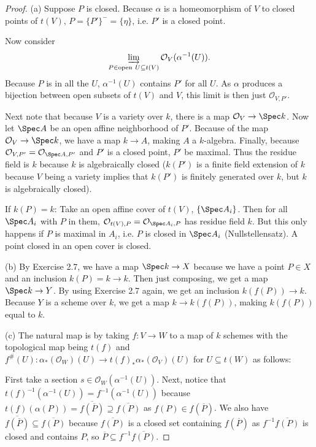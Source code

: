 \begin{proof}
	(a) Suppose $P $ is closed.
	Because $\alpha $ is a homeomorphism of $V $ to closed points of $t(V) $, $P = \{P' \} ^- = \{\eta \}     $, i.e. $P'  $ is a closed point.
	
	Now consider
	\[
		\varinjlim_{P \in \text{open}\ U \subseteq t(V)} \mathcal{O}_V(\alpha ^{-1}(U))
	.\] 
	Because $P $ is in all the $U $, $\alpha ^{-1}(U) $ contains $P'$ for all $U $.
	As $\alpha $ produces a bijection between open subsets of $t(V) $ and $V $, this limit is then just $\mathcal{O}_{V,P' } $.

	Next note that because $V $ is a variety over $k $, there is a map $\mathcal{O}_V \to \Spec k $.
	Now let $\Spec A $ be an open affine neighborhood of $P' $.
	Because of the map $\mathcal{O}_V \to \Spec k $, we have a map $k \to A $, making $A $ a $k $-algebra.
	Finally, because $\mathcal{O}_{V,P'} = \mathcal{O}_{\Spec A,P'} $ and $P' $ is a closed point, $P' $ be maximal.
	Thus the residue field is $k $ because $k $ is algebraically closed ($k(P') $ is a finite field extension of $k $ because $V $ being a variety implies that $k(P') $ is finitely generated over $k $, but $k $ is algebraically closed).

	If $k(P) = k$:
	Take an open affine cover of $t(V) $, $\{\Spec A_i\}   $.
	Then for all $\Spec A_i $ with $P $ in them, $\mathcal{O}_{t(V),P} = \mathcal{O}_{\Spec A_i, P}$ has residue field $k $.
	But this only happens if $P $ is maximal in $A_i $, i.e. $P $ is closed in $\Spec A_i $ (Nullstellensatz).
	A point closed in an open cover is closed.

	(b) By Exercise 2.7, we have a map $\Spec k \to X $ because we have a point $P \in X $ and an inclusion $k(P) = k \to k $.
	Then just composing, we get a map $\Spec k \to Y $.
	By using Exercise 2.7 again, we get an inclusion $k(f(P)) \to k $.
	Because $Y $ is a scheme over $k $, we get a map $k\to k(f(P)) $, making $k(f(P)) $ equal to $k $.

	(c) 
	The natural map is by taking $f: V\to W $ to a map of $k $ schemes with the topological map being $t(f) $ and $f^\#(U): \alpha_{\ast}(\mathcal{O}_W)(U) \to t(f)_\ast \alpha_\ast(\mathcal{O}_V)(U)$ for $U\subseteq t(W) $ as follows:

	First take a section $s \in \mathcal{O}_W(\alpha ^{-1}(U)) $.
	Next, notice that $t(f)^{-1}(\alpha ^{-1}(U)) = f^{-1}(\alpha ^{-1}(U)) $ because $t(f)(\alpha(P)) = \overline{f(\overline{P}) } \supseteq \overline{f(P)}$ as $f(P) \in f(\overline{P})  $. 
	We also have $\overline{f(\overline{P}) } \subseteq \overline{f(P)}   $ because $\overline{f(P)}  $ is a closed set containing $f(\overline{P})  $ as $f^{-1}\overline{f(P)}$ is closed and contains $P $, so $\overline{P} \subseteq f^{-1}\overline{f(P)}   $.


\end{proof}
